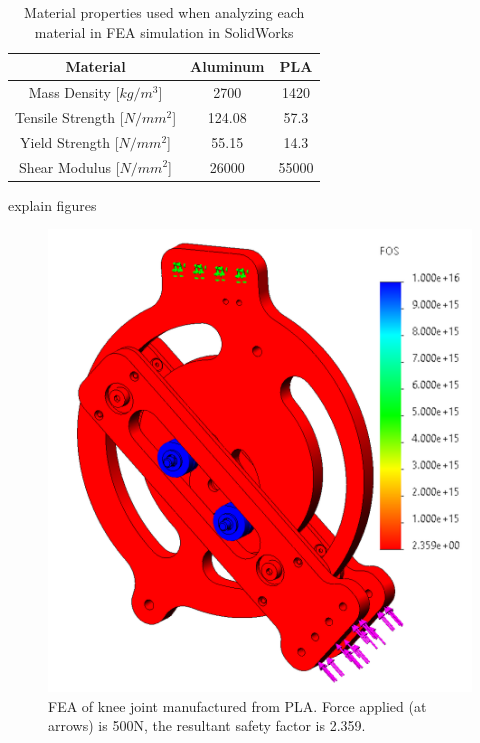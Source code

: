 \begin{table}
    \centering
    \begin{tabular}{ |c|c|c| }
        \hline
        Material & Aluminum & PLA \\
        \hline \hline
        Mass Density [$kg/m^3$] & 2700 & 1420 \\
        \hline
        Tensile Strength [$N/mm^2$] & 124.08 & 57.3\\
        \hline
        Yield Strength [$N/mm^2$] & 55.15 & 14.3\\ 
        \hline
        Shear Modulus [$N/mm^2$] & 26000 & 55000\\
        \hline
    \end{tabular}
    \caption{Material properties used when analyzing each material in FEA simulation in SolidWorks}
    \label{table:MaterialProperties}
\end{table}

explain figures

\begin{figure}[ht!]
    \centering
    \includegraphics[width=0.8\linewidth]{Figures/Design/FEA_PLA_45deg.png}
    \caption{FEA of knee joint manufactured from PLA. Force applied (at arrows) is 500N, the resultant safety factor is 2.359.}
    \label{fig:FEA_PLA}
\end{figure}

